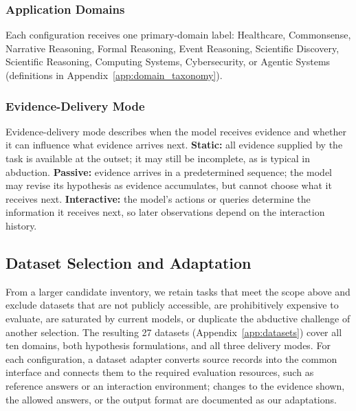 \subsubsection{Application Domains}
\label{sec:methodology_domain_taxonomy}

Each configuration receives one primary-domain label: Healthcare, Commonsense, Narrative Reasoning, Formal Reasoning, Event Reasoning, Scientific Discovery, Scientific Reasoning, Computing Systems, Cybersecurity, or Agentic Systems (definitions in Appendix~\ref{app:domain_taxonomy}).

\subsubsection{Evidence-Delivery Mode}
\label{sec:methodology_data_delivery}

Evidence-delivery mode describes when the model receives evidence and whether it can influence what evidence arrives next.
\textbf{Static:} all evidence supplied by the task is available at the outset; it may still be incomplete, as is typical in abduction.
\textbf{Passive:} evidence arrives in a predetermined sequence; the model may revise its hypothesis as evidence accumulates, but cannot choose what it receives next.
\textbf{Interactive:} the model's actions or queries determine the information it receives next, so later observations depend on the interaction history.



\subsection{Dataset Selection and Adaptation}
\label{sec:methodology_dataset_selection}

From a larger candidate inventory, we retain tasks that meet the scope above and exclude datasets that are not publicly accessible, are prohibitively expensive to evaluate, are saturated by current models, or duplicate the abductive challenge of another selection. The resulting 27 datasets (Appendix~\ref{app:datasets}) cover all ten domains, both hypothesis formulations, and all three delivery modes. For each configuration, a dataset adapter converts source records into the common interface and connects them to the required evaluation resources, such as reference answers or an interaction environment; changes to the evidence shown, the allowed answers, or the output format are documented as our adaptations.

